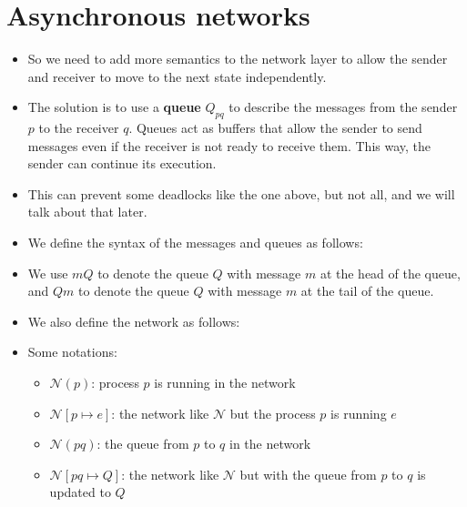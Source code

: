 \documentclass{lecturenotes}
\begin{document}
\section{Asynchronous networks} \label{sec:asyn-networks}
\begin{itemize}
\item So we need to add more semantics to the network layer to allow
      the sender and receiver to move to the next state independently.
\item The solution is to use a \textbf{queue} $Q_{pq}$ to describe the messages
      from the sender $p$ to the receiver $q$. Queues act as buffers that allow
      the sender to send messages even if the receiver is not ready to
      receive them. This way, the sender can continue its execution.
\item This can prevent some deadlocks like the one above, but not all, and
      we will talk about that later.
\item We define the syntax of the messages and queues as follows:
      \begin{syntax}
          \alternative{[d]}
         
      \end{syntax}
\item We use $mQ$ to denote the queue $Q$ with message $m$ at the head of the queue,
      and $Qm$ to denote the queue $Q$ with message $m$ at the tail of the queue.
\item We also define the network as follows:
      \begin{syntax}
             
      \end{syntax}
\item Some notations:
      \begin{itemize}
        \item $\mathcal{N}(p)$: process $p$ is running in the network
        \item $\mathcal{N}[p \mapsto e]$: the network like $\mathcal{N}$ but the process $p$ is running $e$
        \item $\mathcal{N}(pq)$: the queue from $p$ to $q$ in the network
        \item $\mathcal{N}[pq \mapsto Q]$: the network like $\mathcal{N}$ but with the queue from $p$ to $q$ is updated to $Q$

\end{itemize}
\end{itemize}
\end{document}
